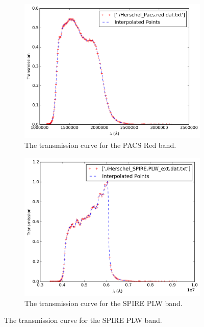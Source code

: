 \documentclass{report}
\begin{document}
\begin{figure}
\begin{subfigure}[b]{.45\linewidth}
\includegraphics[width=\linewidth]{../img/interpolated_red.png}
\caption{The transmission curve for the PACS Red band.}\label{fig:red}
\end{subfigure}
\begin{subfigure}[b]{.45\linewidth}
\includegraphics[width=\linewidth]{../img/interpolated_plw.png}
\caption{The transmission curve for the SPIRE PLW band.}\label{fig:plw}
\end{subfigure}

\end{figure} \label{fig:transmission}
\end{document}
